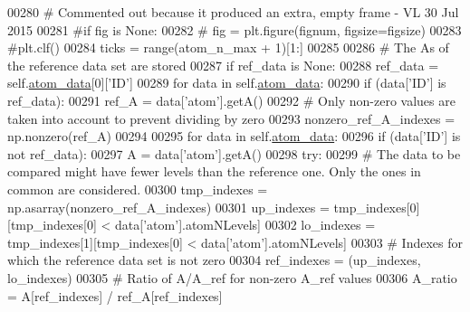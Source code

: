 \begin{DoxyCode}
00280         \textcolor{comment}{# Commented out because it produced an extra, empty frame - VL 30 Jul 2015}
00281         \textcolor{comment}{#if fig is None:}
00282         \textcolor{comment}{#    fig = plt.figure(fignum, figsize=figsize)}
00283         \textcolor{comment}{#plt.clf()}
00284         ticks = range(atom\_n\_max + 1)[1:]
00285 
00286         \textcolor{comment}{# The As of the reference data set are stored}
00287         \textcolor{keywordflow}{if} ref\_data \textcolor{keywordflow}{is} \textcolor{keywordtype}{None}:
00288             ref\_data = self.\hyperlink{classpyneb_1_1plot_1_1plot_atomic_data_1_1_data_plot_aee33ad460a38cb4293a5bd89cec12294}{atom\_data}[0][\textcolor{stringliteral}{'ID'}]
00289         \textcolor{keywordflow}{for} data \textcolor{keywordflow}{in} self.\hyperlink{classpyneb_1_1plot_1_1plot_atomic_data_1_1_data_plot_aee33ad460a38cb4293a5bd89cec12294}{atom\_data}:
00290             \textcolor{keywordflow}{if} (data[\textcolor{stringliteral}{'ID'}] \textcolor{keywordflow}{is} ref\_data):
00291                 ref\_A = data[\textcolor{stringliteral}{'atom'}].getA()
00292                 \textcolor{comment}{# Only non-zero values are taken into account to prevent dividing by zero}
00293                 nonzero\_ref\_A\_indexes = np.nonzero(ref\_A)
00294 
00295         \textcolor{keywordflow}{for} data \textcolor{keywordflow}{in} self.\hyperlink{classpyneb_1_1plot_1_1plot_atomic_data_1_1_data_plot_aee33ad460a38cb4293a5bd89cec12294}{atom\_data}:
00296             \textcolor{keywordflow}{if} (data[\textcolor{stringliteral}{'ID'}] \textcolor{keywordflow}{is} \textcolor{keywordflow}{not} ref\_data):
00297                 A = data[\textcolor{stringliteral}{'atom'}].getA()
00298                 \textcolor{keywordflow}{try}:
00299                     \textcolor{comment}{# The data to be compared might have fewer levels than the reference one. Only the ones
       in common are considered.}
00300                     tmp\_indexes = np.asarray(nonzero\_ref\_A\_indexes) 
00301                     up\_indexes = tmp\_indexes[0][tmp\_indexes[0] < data[\textcolor{stringliteral}{'atom'}].atomNLevels]
00302                     lo\_indexes = tmp\_indexes[1][tmp\_indexes[0] < data[\textcolor{stringliteral}{'atom'}].atomNLevels]
00303                     \textcolor{comment}{# Indexes for which the reference data set is not zero}
00304                     ref\_indexes = (up\_indexes, lo\_indexes)
00305                     \textcolor{comment}{# Ratio of A/A\_ref for non-zero A\_ref values}
00306                     A\_ratio = A[ref\_indexes] / ref\_A[ref\_indexes]

\end{DoxyCode}
